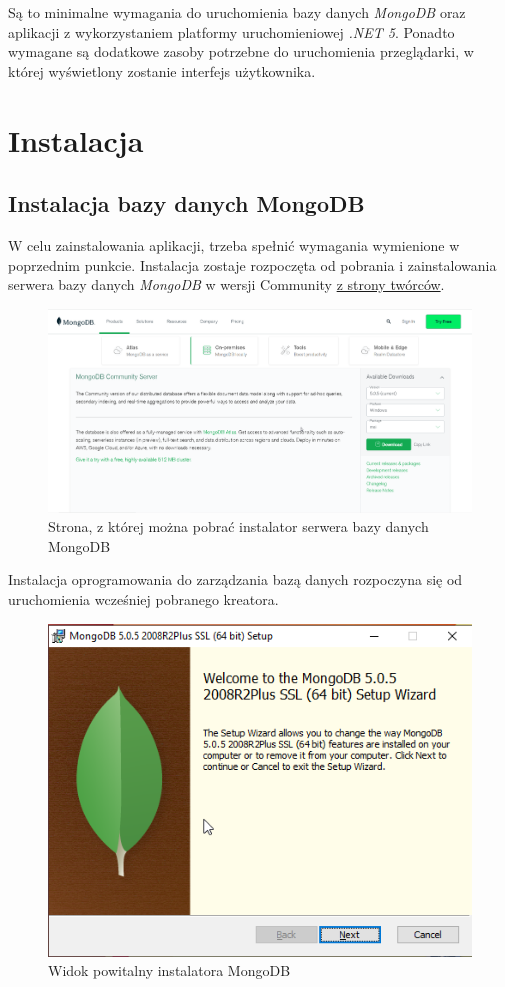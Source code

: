\documentclass[a4paper,twoside,12pt]{book}
\begin{document}
{Są to minimalne wymagania do uruchomienia bazy danych \textit{MongoDB} oraz aplikacji z wykorzystaniem platformy uruchomieniowej \textit{.NET 5}. Ponadto wymagane są dodatkowe zasoby potrzebne do uruchomienia przeglądarki, w której wyświetlony zostanie interfejs użytkownika.

\section {Instalacja}

\subsection{Instalacja bazy danych MongoDB}
W celu zainstalowania aplikacji, trzeba spełnić wymagania wymienione w poprzednim punkcie. Instalacja zostaje rozpoczęta od pobrania i zainstalowania serwera bazy danych \textit{MongoDB} w wersji Community \href{https://www.mongodb.com/try/download/community}{z strony twórców}.
\begin{figure}[h!]
	\centering
	\includegraphics[width=1\linewidth]{../zrzuty_ekranu/instalcja_mongodb/mongodbsite}
	\caption{Strona, z której można pobrać instalator serwera bazy danych MongoDB}
	\label{fig:mongodbsite}
\end{figure}
\FloatBarrier

Instalacja oprogramowania do zarządzania bazą danych rozpoczyna się od uruchomienia wcześniej pobranego kreatora.
\begin{figure}[h!]
	\centering
	\includegraphics[width=0.75\linewidth]{../zrzuty_ekranu/instalcja_mongodb/mongodb1}
	\caption{Widok powitalny instalatora MongoDB}
	\label{fig:mongodb1}
\end{figure}
\FloatBarrier

}
\end{document}
